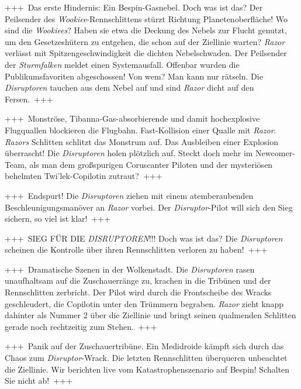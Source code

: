 +++~Das erste Hindernis: Ein Bespin-Gasnebel.
    Doch was ist das?
    Der Peilsender des \textit{Wookiee}-Rennschlittens stürzt Richtung Planetenoberfläche!
    Wo sind die \textit{Wookiees}?
    Haben sie etwa die Deckung des Nebels zur Flucht genutzt, um den Gesetzeshütern zu entgehen, die schon auf der Ziellinie warten?
    \textit{Razor} verlässt mit Spitzengeschwindigkeit die dichten Nebelschwaden.
    Der Peilsender der \textit{Sturmfalken} meldet einen Systemausfall.
    Offenbar wurden die Publikumsfavoriten abgeschossen!
    Von wem?
    Man kann nur rätseln.
    Die \textit{Disruptoren} tauchen aus dem Nebel auf und sind \textit{Razor} dicht auf den Fersen.~+++

+++~Monströse, Tibanna-Gas-absorbierende und damit hochexplosive Flugquallen blockieren die Flugbahn.
    Fast-Kollision einer Qualle mit \textit{Razor}.
    \textit{Razors} Schlitten schlitzt das Monstrum auf.
    Das Ausbleiben einer Explosion überrascht! Die \textit{Disruptoren} holen plötzlich auf.
    Steckt doch mehr im Newcomer-Team, als man dem großspurigen Coruscanter Piloten und der mysteriösen behelmten Twi’lek-Copilotin zutraut?~+++

+++~Endspurt!
    Die \textit{Disruptoren} ziehen mit einem atemberaubenden Beschleunigungsmanöver an \textit{Razor} vorbei.
    Der \textit{Disruptor}-Pilot will sich den Sieg sichern, so viel ist klar!~+++

+++~SIEG FÜR DIE \textit{DISRUPTOREN}!!!
    Doch was ist das?
    Die \textit{Disruptoren} scheinen die Kontrolle über ihren Rennschlitten verloren zu haben!~+++

+++~Dramatische Szenen in der Wolkenstadt.
    Die \textit{Disruptoren} rasen unaufhaltsam auf die Zuschauerränge zu, krachen in die Tribünen und der Rennschlitten zerbricht.
    Der Pilot wird durch die Frontscheibe des Wracks geschleudert, die Copilotin unter den Trümmern begraben.
    \textit{Razor} zieht knapp dahinter als Nummer 2 über die Ziellinie und bringt seinen qualmenden Schlitten gerade noch rechtzeitig zum Stehen.~+++

+++~Panik auf der Zuschauertribüne.
    Ein Medidroide kämpft sich durch das Chaos zum \textit{Disruptor}-Wrack.
    Die letzten Rennschlitten überqueren unbeachtet die Ziellinie.
    Wir berichten live vom Katastrophenszenario auf Bespin! Schalten Sie nicht ab!~+++

\setlength{\parskip}{0pt}
\setbeforeparaskip{0pt}
\setparaheadstyle{}
\setsubsubsecheadstyle{\centering\bfseries}


